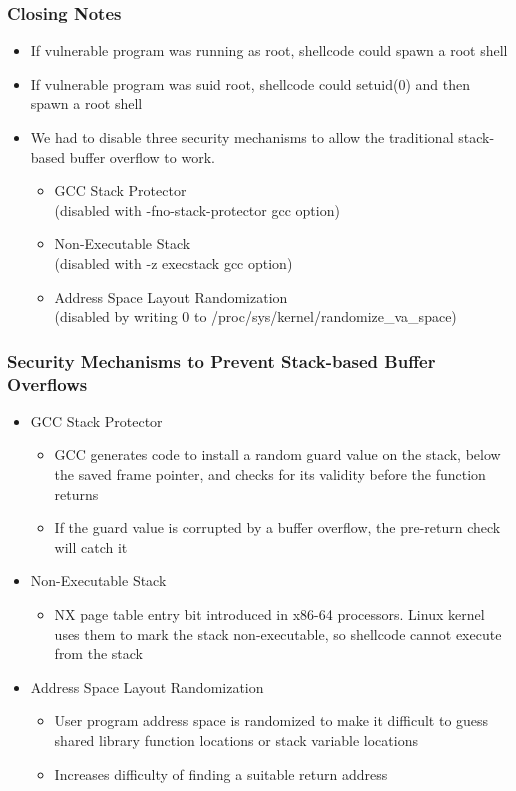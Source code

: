 \documentclass[11pt,xcolor=dvipsnames]{beamer}
\begin{document}
\begin{frame}[fragile,t]
\frametitle{Closing Notes}
\begin{itemize}
  \item If vulnerable program was running as root, shellcode could spawn a root shell
  \item If vulnerable program was suid root, shellcode could setuid(0) and then spawn a root shell
  \pause
  \item We had to disable three security mechanisms to allow the traditional stack-based buffer overflow to work.
  \begin{itemize}
    \item GCC Stack Protector \\ (disabled with {\small \ttfamily -fno-stack-protector} gcc option)
    \item Non-Executable Stack \\ (disabled with {\small \ttfamily -z execstack} gcc option)
    \item Address Space Layout Randomization \\ (disabled by writing 0 to {\small \ttfamily /proc/sys/kernel/randomize\_va\_space})
  \end{itemize}
\end{itemize}
\end{frame}

\begin{frame}[fragile,t]
\frametitle{Security Mechanisms to Prevent Stack-based Buffer Overflows}
\begin{itemize}
  \item GCC Stack Protector
  \begin{itemize}
    \item GCC generates code to install a random guard value on the stack, below the saved frame pointer, and checks for its validity before the function returns
    \item If the guard value is corrupted by a buffer overflow, the pre-return check will catch it
  \end{itemize}
  \pause
  \item Non-Executable Stack
  \begin{itemize}
    \item NX page table entry bit introduced in x86-64 processors. Linux kernel uses them to mark the stack non-executable, so shellcode cannot execute from the stack
  \end{itemize}
  \pause
  \item Address Space Layout Randomization
  \begin{itemize}
    \item User program address space is randomized to make it difficult to guess shared library function locations or stack variable locations
    \item Increases difficulty of finding a suitable return address
  \end{itemize}
\end{itemize}
\end{frame}
\end{document}
